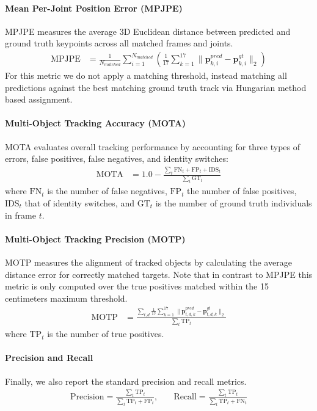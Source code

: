 \paragraph{Mean Per-Joint Position Error (MPJPE)}
MPJPE measures the average 3D Euclidean distance between predicted and ground truth keypoints across all matched frames and joints.
\begin{align*}
    \text{MPJPE} &= \frac{1}{N_{matched}} \sum_{i=1}^{N_{matched}} \left( \frac{1}{17} \sum_{k=1}^{17} \|\mathbf{p}_{k,i}^{pred} - \mathbf{p}_{k,i}^{gt}\|_2 \right)
\end{align*}
For this metric we do not apply a matching threshold, instead matching all predictions against the best matching ground truth track via Hungarian method based assignment.

\paragraph{Multi-Object Tracking Accuracy (MOTA)}
MOTA evaluates overall tracking performance by accounting for three types of errors, false positives, false negatives, and identity switches:
\begin{align*}
    \text{MOTA} &= 1.0 - \frac{\sum_{t} \text{FN}_t + \text{FP}_t + \text{IDS}_t}{\sum_{t} \text{GT}_t}
\end{align*}
where $\text{FN}_t$ is the number of false negatives, $\text{FP}_t$ the number of false positives, $\text{IDS}_t$ that of identity switches, and $\text{GT}_t$ is the number of ground truth individuals in frame $t$.

\paragraph{Multi-Object Tracking Precision (MOTP)}
MOTP measures the alignment of tracked objects by calculating the average distance error for correctly matched targets. Note that in contrast to MPJPE this metric is only computed over the true positives matched within the 15 centimeters maximum threshold.
\begin{align*}
    \text{MOTP} &= \frac{\sum_{t,d} \frac{1}{17} \sum_{k=1}^{17} \|\mathbf{p}_{t,d,k}^{pred} - \mathbf{p}_{t,d,k}^{gt}\|_2}{\sum_{t} \text{TP}_t}
\end{align*}
where $\text{TP}_t$ is the number of true positives.

\paragraph{Precision and Recall}
Finally, we also report the standard precision and recall metrics.
\begin{align*}
    \text{Precision} = \frac{\sum_t \text{TP}_t}{\sum_t \text{TP}_t + \text{FP}_t}, &\quad \text{Recall} = \frac{\sum_t \text{TP}_t}{\sum_t \text{TP}_t + \text{FN}_t}
\end{align*}
